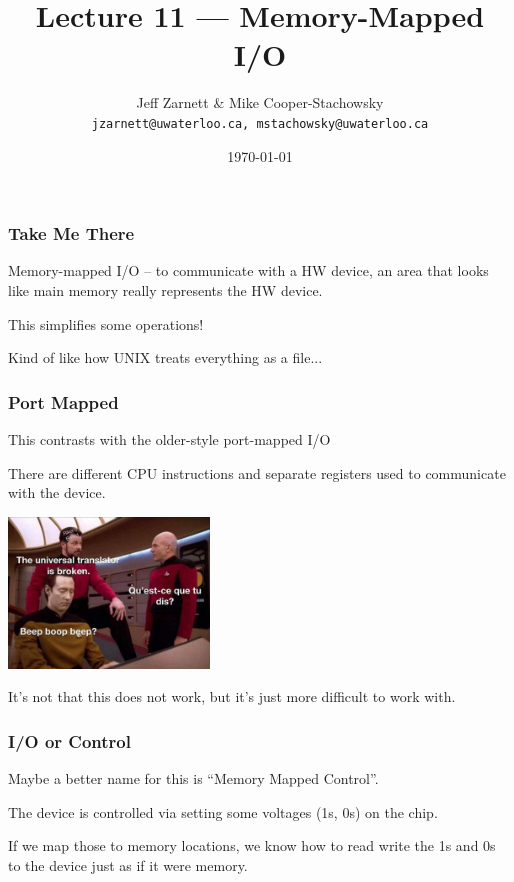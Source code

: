 

\title{Lecture 11 --- Memory-Mapped I/O}

\author{Jeff Zarnett \& Mike Cooper-Stachowsky \\ \small \texttt{jzarnett@uwaterloo.ca, mstachowsky@uwaterloo.ca}}
\date{\today}



\begin{frame}
  \titlepage

 \end{frame}


\begin{frame}
\frametitle{Take Me There}

Memory-mapped I/O -- to communicate with a HW device, an area that looks like main memory really represents the HW device.

This simplifies some operations!

Kind of like how UNIX treats everything as a file...

\end{frame}

\begin{frame}
\frametitle{Port Mapped}

This contrasts with the older-style \alert{port-mapped} I/O

There are different CPU instructions and separate registers used to communicate with the device. 

\begin{center}
	\includegraphics[width=0.4\textwidth]{images/translator.jpg}
\end{center}

It's not that this does not work, but it's just more difficult to work with.

\end{frame}


\begin{frame}
\frametitle{I/O or Control}

Maybe a better name for this is ``Memory Mapped Control''.

The device is controlled via setting some voltages (1s, 0s) on the chip.

If we map those to memory locations, we know how to read write the 1s and 0s to the device just as if it were memory.

\end{frame}


